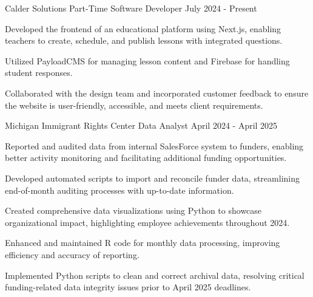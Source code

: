 \documentclass{../styles/cv}
\begin{document}
\subsectionpositiondate
    {Calder Solutions}
    {Part-Time Software Developer}
    {July 2024 - Present}
\resumesublistbegin
    \item Developed the frontend of an educational platform using Next.js, enabling teachers to create, schedule, and publish lessons with integrated questions.
    \item Utilized PayloadCMS for managing lesson content and Firebase for handling student responses.
    \item Collaborated with the design team and incorporated customer feedback to ensure the website is user-friendly, accessible, and meets client requirements.
\resumesublistend

\subsectionpositiondate
    {Michigan Immigrant Rights Center}
    {Data Analyst}
    {April 2024 - April 2025}
\resumesublistbegin
    \item Reported and audited data from internal SalesForce system to funders, enabling better activity monitoring and facilitating additional funding opportunities.
    \item Developed automated scripts to import and reconcile funder data, streamlining end-of-month auditing processes with up-to-date information.
    \item Created comprehensive data visualizations using Python to showcase organizational impact, highlighting employee achievements throughout 2024.
    \item Enhanced and maintained R code for monthly data processing, improving efficiency and accuracy of reporting.
    \item Implemented Python scripts to clean and correct archival data, resolving critical funding-related data integrity issues prior to April 2025 deadlines.
\resumesublistend
\end{document}
